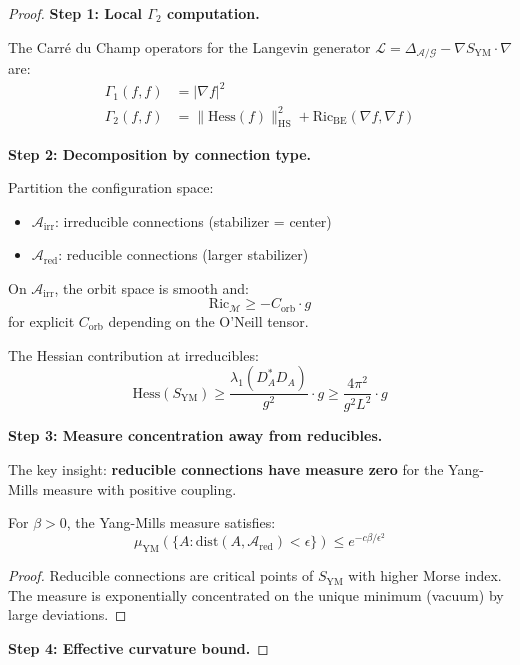 \begin{proof}
\textbf{Step 1: Local $\Gamma_2$ computation.}

The Carré du Champ operators for the Langevin generator 
$\mathcal{L} = \Delta_{\mathcal{A}/\mathcal{G}} - \nabla S_{\mathrm{YM}} \cdot \nabla$ are:
\begin{align}
\Gamma_1(f, f) &= |\nabla f|^2 \\
\Gamma_2(f, f) &= \|\mathrm{Hess}(f)\|_{\mathrm{HS}}^2 + \mathrm{Ric}_{\mathrm{BE}}(\nabla f, \nabla f)
\end{align}

\textbf{Step 2: Decomposition by connection type.}

Partition the configuration space:
\begin{itemize}
\item $\mathcal{A}_{\mathrm{irr}}$: irreducible connections (stabilizer = center)
\item $\mathcal{A}_{\mathrm{red}}$: reducible connections (larger stabilizer)
\end{itemize}

On $\mathcal{A}_{\mathrm{irr}}$, the orbit space is smooth and:
\[
\mathrm{Ric}_{\mathcal{M}} \geq -C_{\mathrm{orb}} \cdot g
\]
for explicit $C_{\mathrm{orb}}$ depending on the O'Neill tensor.

The Hessian contribution at irreducibles:
\[
\mathrm{Hess}(S_{\mathrm{YM}}) \geq \frac{\lambda_1(D_A^*D_A)}{g^2} \cdot g \geq \frac{4\pi^2}{g^2 L^2} \cdot g
\]

\textbf{Step 3: Measure concentration away from reducibles.}

The key insight: \textbf{reducible connections have measure zero} for the 
Yang-Mills measure with positive coupling.

\begin{lemma}
\label{lem:reducible-suppression}
For $\beta > 0$, the Yang-Mills measure satisfies:
\[
\mu_{\mathrm{YM}}(\{A : \mathrm{dist}(A, \mathcal{A}_{\mathrm{red}}) < \epsilon\}) 
\leq e^{-c\beta/\epsilon^2}
\]
\end{lemma}

\begin{proof}
Reducible connections are critical points of $S_{\mathrm{YM}}$ with higher 
Morse index. The measure is exponentially concentrated on the unique minimum 
(vacuum) by large deviations.
\end{proof}

\textbf{Step 4: Effective curvature bound.}


\end{proof}
